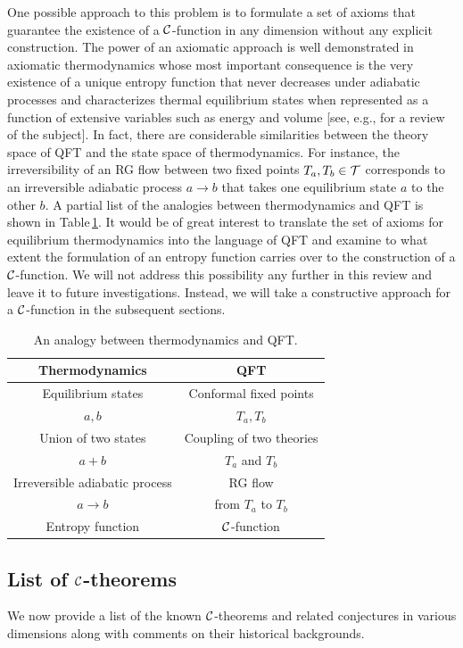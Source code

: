 One possible approach to this problem is to formulate a set of axioms that guarantee the existence of a ${\cal C}$-function in any dimension without any explicit construction.
The power of an axiomatic approach is well demonstrated in axiomatic thermodynamics whose most important consequence is the very existence of a unique entropy function that never decreases under adiabatic processes and characterizes thermal equilibrium states when represented as a function of extensive variables such as energy and volume [see, e.g., \textcite{Lieb:1997mi} for a review of the subject].
In fact, there are considerable similarities between the theory space of QFT and the state space of thermodynamics.
For instance, the irreversibility of an RG flow between two fixed points $T_a,T_b \in {\cal T}$ corresponds to an irreversible adiabatic process $a \to b$ that takes one equilibrium state $a$ to the other $b$.
A partial list of the analogies between thermodynamics and QFT is shown in Table\,\ref{tab:Analogy}.
It would be of great interest to translate the set of axioms for equilibrium thermodynamics into the language of QFT and examine to what extent the formulation of an entropy function carries over to the construction of a ${\cal C}$-function.
We will not address this possibility any further in this review and leave it to future investigations.
Instead, we will take a constructive approach for a ${\cal C}$-function in the subsequent sections.

\begin{table}
\caption{\label{tab:Analogy}An analogy between thermodynamics and QFT.}
\begin{ruledtabular}
\begin{tabular}{cc}
	Thermodynamics & QFT \\
	\hline
	Equilibrium states  & Conformal fixed points\\
	$a,b$ & $T_a, T_b$ \\
	Union of two states & Coupling of two theories\\
	$a+b$ & $T_a$ and $T_b$ \\
	Irreversible adiabatic process & RG flow \\
		$a\rightarrow b$ & from $T_a$ to $T_b$\\
	Entropy function & ${\cal C}$-function
\end{tabular}
\end{ruledtabular}
\end{table}


\subsection{List of ${\cal C}$-theorems}
We now provide a list of the known ${\cal C}$-theorems and related conjectures in various dimensions along with comments on their historical backgrounds.

